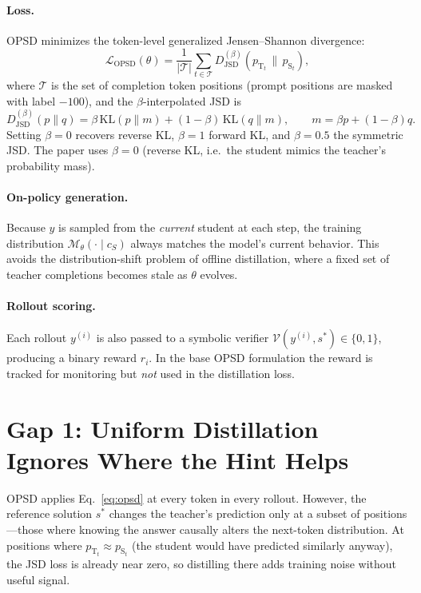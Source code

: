 \documentclass[11pt]{article}
\newcommand{\pT}{p_{\mathrm{T}}}
\newcommand{\pS}{p_{\mathrm{S}}}
\newcommand{\KL}{\mathrm{KL}}
\newcommand{\JSD}{\mathrm{JSD}}
\begin{document}
\paragraph{Loss.}
OPSD minimizes the token-level generalized Jensen--Shannon divergence:
\begin{equation}
  \mathcal{L}_{\mathrm{OPSD}}(\theta)
  = \frac{1}{|\mathcal{T}|}\sum_{t \in \mathcal{T}}
    D_{\JSD}^{(\beta)}\!\left(\pT_t \,\|\, \pS_t\right),
  \label{eq:opsd}
\end{equation}
where $\mathcal{T}$ is the set of completion token positions (prompt positions are masked
with label $-100$), and the $\beta$-interpolated JSD is
\begin{equation}
  D_{\JSD}^{(\beta)}(p \| q)
  = \beta\,\KL(p \| m) + (1-\beta)\,\KL(q \| m),
  \qquad m = \beta p + (1-\beta)q.
\end{equation}
Setting $\beta=0$ recovers reverse KL, $\beta=1$ forward KL, and $\beta=0.5$ the symmetric
JSD.  The paper uses $\beta=0$ (reverse KL, i.e.\ the student mimics the teacher's
probability mass).

\paragraph{On-policy generation.}
Because $y$ is sampled from the \emph{current} student at each step, the training
distribution $\mathcal{M}_\theta(\cdot \mid c_S)$ always matches the model's current
behavior.  This avoids the distribution-shift problem of offline distillation, where a fixed
set of teacher completions becomes stale as $\theta$ evolves.

\paragraph{Rollout scoring.}
Each rollout $y^{(i)}$ is also passed to a symbolic verifier $\mathcal{V}(y^{(i)}, s^*)
\in \{0,1\}$, producing a binary reward $r_i$.  In the base OPSD formulation the reward is
tracked for monitoring but \emph{not} used in the distillation loss.

\section{Gap 1: Uniform Distillation Ignores Where the Hint Helps}
\label{sec:ch-opd}

OPSD applies Eq.~\eqref{eq:opsd} at every token in every rollout.  However, the reference
solution $s^*$ changes the teacher's prediction only at a subset of positions—those where
knowing the answer causally alters the next-token distribution.  At positions where
$\pT_t \approx \pS_t$ (the student would have predicted similarly anyway), the JSD loss is
already near zero, so distilling there adds training noise without useful signal.
\end{document}
